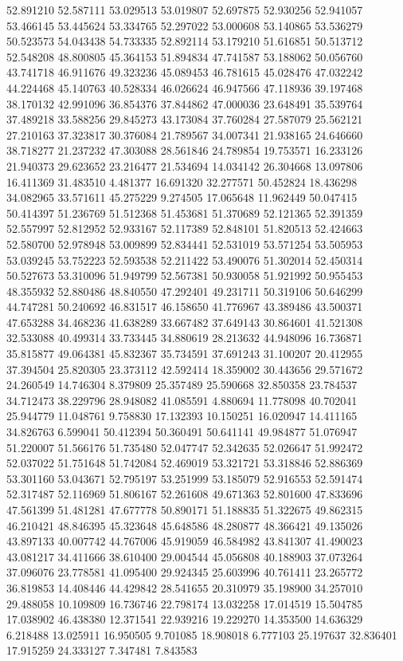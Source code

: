 52.891210
52.587111
53.029513
53.019807
52.697875
52.930256
52.941057
53.466145
53.445624
53.334765
52.297022
53.000608
53.140865
53.536279
50.523573
54.043438
54.733335
52.892114
53.179210
51.616851
50.513712
52.548208
48.800805
45.364153
51.894834
47.741587
53.188062
50.056760
43.741718
46.911676
49.323236
45.089453
46.781615
45.028476
47.032242
44.224468
45.140763
40.528334
46.026624
46.947566
47.118936
39.197468
38.170132
42.991096
36.854376
37.844862
47.000036
23.648491
35.539764
37.489218
33.588256
29.845273
43.173084
37.760284
27.587079
25.562121
27.210163
37.323817
30.376084
21.789567
34.007341
21.938165
24.646660
38.718277
21.237232
47.303088
28.561846
24.789854
19.753571
16.233126
21.940373
29.623652
23.216477
21.534694
14.034142
26.304668
13.097806
16.411369
31.483510
4.481377
16.691320
32.277571
50.452824
18.436298
34.082965
33.571611
45.275229
9.274505
17.065648
11.962449
50.047415
50.414397
51.236769
51.512368
51.453681
51.370689
52.121365
52.391359
52.557997
52.812952
52.933167
52.117389
52.848101
51.820513
52.424663
52.580700
52.978948
53.009899
52.834441
52.531019
53.571254
53.505953
53.039245
53.752223
52.593538
52.211422
53.490076
51.302014
52.450314
50.527673
53.310096
51.949799
52.567381
50.930058
51.921992
50.955453
48.355932
52.880486
48.840550
47.292401
49.231711
50.319106
50.646299
44.747281
50.240692
46.831517
46.158650
41.776967
43.389486
43.500371
47.653288
34.468236
41.638289
33.667482
37.649143
30.864601
41.521308
32.533088
40.499314
33.733445
34.880619
28.213632
44.948096
16.736871
35.815877
49.064381
45.832367
35.734591
37.691243
31.100207
20.412955
37.394504
25.820305
23.373112
42.592414
18.359002
30.443656
29.571672
24.260549
14.746304
8.379809
25.357489
25.590668
32.850358
23.784537
34.712473
38.229796
28.948082
41.085591
4.880694
11.778098
40.702041
25.944779
11.048761
9.758830
17.132393
10.150251
16.020947
14.411165
34.826763
6.599041
50.412394
50.360491
50.641141
49.984877
51.076947
51.220007
51.566176
51.735480
52.047747
52.342635
52.026647
51.992472
52.037022
51.751648
51.742084
52.469019
53.321721
53.318846
52.886369
53.301160
53.043671
52.795197
53.251999
53.185079
52.916553
52.591474
52.317487
52.116969
51.806167
52.261608
49.671363
52.801600
47.833696
47.561399
51.481281
47.677778
50.890171
51.188835
51.322675
49.862315
46.210421
48.846395
45.323648
45.648586
48.280877
48.366421
49.135026
43.897133
40.007742
44.767006
45.919059
46.584982
43.841307
41.490023
43.081217
34.411666
38.610400
29.004544
45.056808
40.188903
37.073264
37.096076
23.778581
41.095400
29.924345
25.603996
40.761411
23.265772
36.819853
14.408446
44.429842
28.541655
20.310979
35.198900
34.257010
29.488058
10.109809
16.736746
22.798174
13.032258
17.014519
15.504785
17.038902
46.438380
12.371541
22.939216
19.229270
14.353500
14.636329
6.218488
13.025911
16.950505
9.701085
18.908018
6.777103
25.197637
32.836401
17.915259
24.333127
7.347481
7.843583
